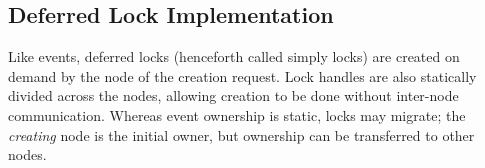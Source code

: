 

\subsection{Deferred Lock Implementation}
\label{subsec:lockimpl}

Like events, deferred locks (henceforth called simply locks) are
created on demand by the node of the creation request. 
Lock handles are also statically divided across the nodes,
allowing creation to be done without inter-node communication.
Whereas event ownership is static, locks may migrate; the {\em
  creating} node is the initial owner, but ownership can be
transferred to other nodes.

